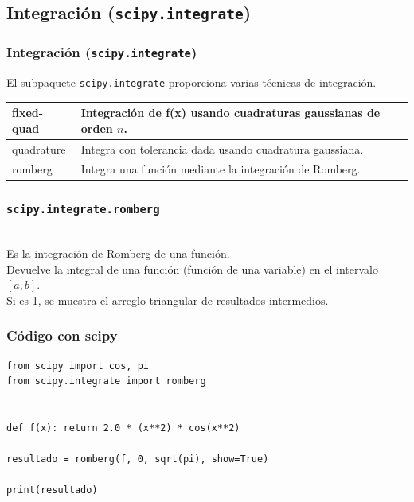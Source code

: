 \subsection{Integración (\texttt{scipy.integrate})}
\begin{frame}
\frametitle{Integración (\texttt{scipy.integrate})}
El subpaquete \texttt{scipy.integrate} proporciona varias técnicas de integración.
\fontsize{12}{12}\selectfont
\begin{tabular}{l | p{8cm}}
fixed-quad 	& Integración de f(x) usando cuadraturas gaussianas de orden $n$. \\ \hline
quadrature 	& Integra con tolerancia dada usando cuadratura gaussiana. \\ \hline
romberg 	& Integra una función mediante la integración de Romberg.
\end{tabular}
\end{frame}
\begin{frame}[fragile]
\frametitle{\texttt{scipy.integrate.romberg}}
\fontsize{11}{11}\selectfont
{}
\\
\bigskip
\pause
\fontsize{14}{14}\selectfont
Es la integración de Romberg de una función.
\\
\medskip
\pause
Devuelve la integral de una función (función de una variable) en el intervalo $[a,b]$.
\\
\medskip
\pause
Si  es 1, se muestra el arreglo triangular de resultados intermedios.
\end{frame}
\begin{frame}[fragile]
\frametitle{Código con scipy}
\begin{lstlisting}[caption=Integración Romeberg con scipy, style=FormattedNumber, basicstyle=\linespread{1.1}\ttfamily=\small, columns=fullflexible]
from scipy import cos, pi
from scipy.integrate import romberg


def f(x): return 2.0 * (x**2) * cos(x**2)

resultado = romberg(f, 0, sqrt(pi), show=True)

print(resultado)
\end{lstlisting}
\end{frame}

